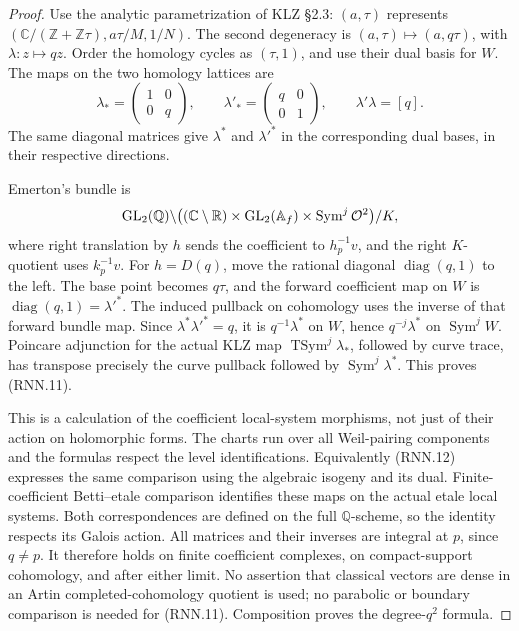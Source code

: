 \begin{proof}
Use the analytic parametrization of KLZ \S2.3:
\((a,\tau)\) represents
\((\mathbb C/(\mathbb Z+\mathbb Z\tau),a\tau/M,1/N)\).
The second degeneracy is
\((a,\tau)\mapsto(a,q\tau)\), with
\(\lambda:z\mapsto qz\).
Order the homology cycles as \((\tau,1)\), and use their dual
basis for \(W\).  The maps on the two homology lattices are
\[
 \lambda_*=\begin{pmatrix}1&0\\0&q\end{pmatrix},
 \qquad
 \lambda'_*=\begin{pmatrix}q&0\\0&1\end{pmatrix},
 \qquad \lambda'\lambda=[q].
 \tag{RNN.12}
\]
The same diagonal matrices give \(\lambda^*\) and \(\lambda'^*\)
in the corresponding dual bases, in their respective directions.

Emerton's bundle is
\[
 {\rm GL}_2(\mathbb Q)\backslash
  \bigl((\mathbb C\setminus\mathbb R)\times
       {\rm GL}_2(\mathbb A_f)\times\operatorname{Sym}^j\mathcal O^2\bigr)/K,
\]
where right translation by \(h\) sends the coefficient to
\(h_p^{-1}v\), and the right \(K\)-quotient uses \(k_p^{-1}v\).
For \(h=D(q)\), move the rational diagonal
\(\operatorname{diag}(q,1)\) to the left.  The base point becomes
\(q\tau\), and the forward coefficient map on \(W\) is
\(\operatorname{diag}(q,1)=\lambda'^*\).
The induced pullback on cohomology uses the inverse of that
forward bundle map.  Since
\(\lambda^*\lambda'^*=q\), it is
\(q^{-1}\lambda^*\) on \(W\), hence \(q^{-j}\lambda^*\)
on \(\operatorname{Sym}^jW\).
Poincare adjunction for the actual KLZ map
\(\operatorname{TSym}^j\lambda_*\), followed by curve trace,
has transpose precisely the curve pullback followed by
\(\operatorname{Sym}^j\lambda^*\).
This proves (RNN.11).

This is a calculation of the coefficient local-system morphisms,
not just of their action on holomorphic forms.
The charts run over all Weil-pairing components and the formulas
respect the level identifications.  Equivalently (RNN.12) expresses
the same comparison using the algebraic isogeny and its dual.
Finite-coefficient Betti--etale comparison identifies these maps
on the actual etale local systems.  Both correspondences are
defined on the full \(\mathbb Q\)-scheme, so the identity respects
its Galois action.  All matrices and their inverses are integral
at \(p\), since \(q\ne p\).
It therefore holds on finite coefficient complexes, on
compact-support cohomology, and after either limit.
No assertion that classical vectors are dense in an Artin
completed-cohomology quotient is used; no parabolic or boundary
comparison is needed for (RNN.11).
Composition proves the degree-\(q^2\) formula.
\end{proof}

